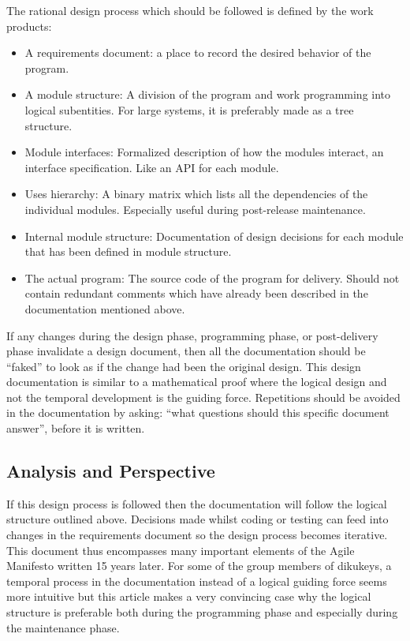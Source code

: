 \documentclass[11pt,a4paper]{report}
\begin{document}
The rational design process which should be followed is defined by the work products:
\begin{itemize}
\item A requirements document: a place to record the desired behavior of the program.
\item A module structure: A division of the program and work programming into logical subentities. For large systems, it is preferably made as a tree structure.
\item Module interfaces: Formalized description of how the modules interact, an interface specification. Like an API for each module.
\item Uses hierarchy: A binary matrix which lists all the dependencies of the individual modules. Especially useful during post-release maintenance.
\item Internal module structure: Documentation of design decisions for each module that has been defined in module structure. 
\item The actual program: The source code of the program for delivery. Should not contain redundant comments which have already been described in the documentation mentioned above.
\end{itemize}
If any changes during the design phase, programming phase, or post-delivery phase invalidate a design document, then all the documentation should be ``faked'' to look as if the change had been the original design. This design documentation is similar to a mathematical proof where the logical design and not the temporal development is the guiding force. Repetitions should be avoided in the documentation by asking: ``what questions should this specific document answer'', before it is written.
\subsection{Analysis and Perspective}
If this design process is followed then the documentation will follow the logical structure outlined above. Decisions made whilst coding or testing can feed into changes in the requirements document so the design process becomes iterative. This document thus encompasses many important elements of the Agile Manifesto\cite{beck} written 15 years later. For some of the group members of dikukeys, a temporal process in the documentation instead of a logical guiding force seems more intuitive but this article makes a very convincing case why the logical structure is preferable both during the programming phase and especially during the maintenance phase.
\end{document}

